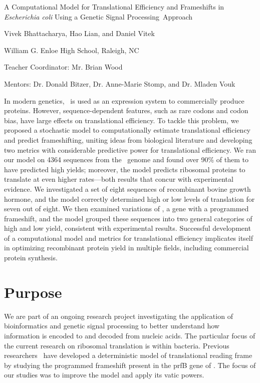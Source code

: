 \documentclass{article}
\newcommand{\BWFtitle}[2]{A Computational Model for Translational
  Efficiency and Frameshifts in #1{Escherichia coli} Using a Genetic Signal
  Processing#2Approach}
\begin{document}
\begin{center}
\noindent\BWFtitle{\emph}{~}

Vivek Bhattacharya, Hao Lian, and Daniel Vitek

William G. Enloe High School, Raleigh, NC

Teacher Coordinator: Mr. Brian Wood

Mentors: Dr. Donald Bitzer, Dr. Anne-Marie Stomp, and Dr. Mladen Vouk
\end{center}
\begin{onecolabstract}


In modern genetics, \ecoli\ is used as an expression system to commercially 
produce proteins.  However, sequence-dependent features, such as rare codons 
and codon bias, have large effects on translational efficiency.  To tackle 
this problem, we proposed a stochastic model to computationally estimate 
translational efficiency and predict frameshifting, uniting ideas from biological 
literature and developing two metrics with considerable predictive power 
for translational efficiency. We ran our model on 4364 sequences from the 
\ecoli\ genome and found over 90\% of them to have predicted high yields; 
moreover, the model predicts ribosomal proteins to translate at even higher rates---both 
results that concur with experimental evidence.  We investigated a set of eight 
sequences of recombinant bovine growth hormone, and the model correctly determined 
high or low levels of translation for seven out of eight.  We then examined variations of
\prfB, a gene with a programmed frameshift, and the model grouped these sequences 
into two general categories of high and low yield, consistent 
with experimental results.  Successful development of a computational model and 
metrics for translational efficiency implicates itself in optimizing 
recombinant protein yield in multiple fields, including commercial protein synthesis.
\end{onecolabstract}
\newpage

\section{Purpose}
We are part of an ongoing research project
investigating the application of bioinformatics
and genetic signal processing to better understand how
information is encoded to and decoded from nucleic acids.  The particular
focus of the current research on ribosomal translation is within
bacteria.  Previous researchers~\cite{lalit:mechanics}
have developed a deterministic model
of translational reading frame by studying the
programmed frameshift present in the prfB gene of \ecoli.  The focus
of our studies was to improve the model and apply its vatic powers.
\end{document}
